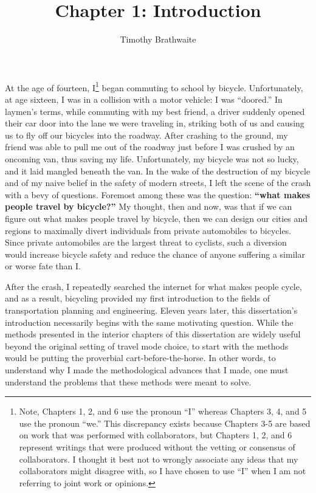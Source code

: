 \documentclass{article}
\title{Chapter 1: Introduction}
\author{Timothy Brathwaite}
\date{}
\begin{document}
\maketitle
At the age of fourteen, I\footnote{Note, Chapters 1, 2, and 6 use the pronoun ``I'' whereas Chapters 3, 4, and 5 use the pronoun ``we.'' This discrepancy exists because Chapters 3-5 are based on work that was performed with collaborators, but Chapters 1, 2, and 6 represent writings that were produced without the vetting or consensus of collaborators. I thought it best not to wrongly associate any ideas that my collaborators might disagree with, so I have chosen to use ``I'' when I am not referring to joint work or opinions.} began commuting to school by bicycle. Unfortunately, at age sixteen, I was in a collision with a motor vehicle: I was ``doored.'' In laymen's terms, while commuting with my best friend, a driver suddenly opened their car door into the lane we were traveling in, striking both of us and causing us to fly off our bicycles into the roadway. After crashing to the ground, my friend was able to pull me out of the roadway just before I was crushed by an oncoming van, thus saving my life. Unfortunately, my bicycle was not so lucky, and it laid mangled beneath the van. In the wake of the destruction of my bicycle and of my naive belief in the safety of modern streets, I left the scene of the crash with a bevy of questions. Foremost among these was the question: \textbf{``what makes people travel by bicycle?''} My thought, then and now, was that if we can figure out what makes people travel by bicycle, then we can design our cities and regions to maximally divert individuals from private automobiles to bicycles. Since private automobiles are the largest threat to cyclists, such a diversion would increase bicycle safety and reduce the chance of anyone suffering a similar or worse fate than I.

After the crash, I repeatedly searched the internet for what makes people cycle, and as a result, bicycling provided my first introduction to the fields of transportation planning and engineering. Eleven years later, this dissertation's introduction necessarily begins with the same motivating question. While the methods presented in the interior chapters of this dissertation are widely useful beyond the original setting of travel mode choice, to start with the methods would be putting the proverbial cart-before-the-horse. In other words, to understand why I made the methodological advances that I made, one must understand the problems that these methods were meant to solve.
\end{document}
